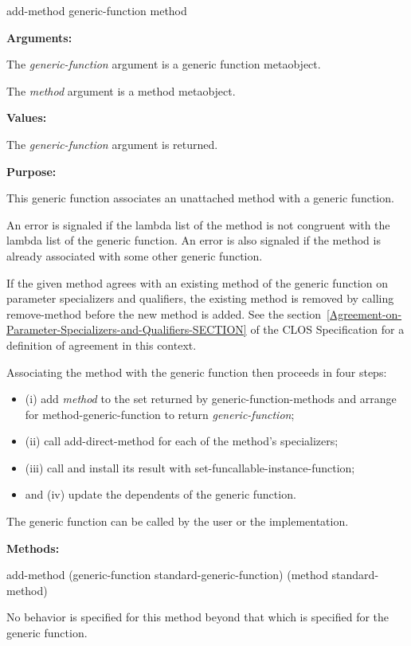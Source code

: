 \begin{defun}
add-method generic-function method

\textbf{Arguments:}

The \emph{generic-function} argument is a generic function metaobject.

The \emph{method} argument is a method metaobject.

\textbf{Values:}

The \emph{generic-function} argument is returned.

\textbf{Purpose:}

This generic function associates an unattached method with a generic function. 

An error is signaled if the lambda list of the method is not congruent with the
lambda list of the generic function. An error is also signaled if the method is
already associated with some other generic function. 

If the given method agrees with an existing method of the generic function on
parameter specializers and qualifiers, the existing method is removed by calling
remove-method before the new method is added. See the
section~\ref{Agreement-on-Parameter-Specializers-and-Qualifiers-SECTION} of the
CLOS Specification for a definition of agreement in this context.

Associating the method with the generic function then proceeds in four steps:
\begin{itemize}
\item (i) add \emph{method} to the set returned by generic-function-methods and arrange
  for method-generic-function to return \emph{generic-function};
\item (ii) call add-direct-method for each of the method's specializers;
\item (iii) call  and install its result
  with set-funcallable-instance-function;
\item and (iv) update the dependents of the generic function.
\end{itemize}
The generic function  can be called by the user or the implementation.

\textbf{Methods:}

\begin{defun}
add-method (generic-function standard-generic-function) (method standard-method)

No behavior is specified for this method beyond that which is specified for the
generic function.
\end{defun}
\end{defun}

